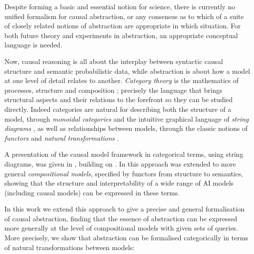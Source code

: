 \documentclass{article}
\begin{document}
Despite forming a basic and essential notion for science, there is currently no unified formalism for causal abstraction, or any consensus as to which of a suite of closely related notions of abstraction are appropriate in which situation. For both future theory and experiments in abstraction, an appropriate conceptual language is needed.  


Now, causal reasoning is all about the interplay between syntactic causal structure and semantic probabilistic data, while abstraction is about how a model at one level of detail relates to another. \emph{Category theory} is the mathematics of processes, structure and composition \cite{coecke2006introducing,leinster2014basic}; precisely the language that brings structural aspects and their relations to the forefront so they can be studied directly. Indeed categories are natural for describing both the structure of a model, through \emph{monoidal categories} and the intuitive graphical language of \emph{string diagrams} \cite{piedeleu2023introduction,lorenz2023causal,tull2024towards}, as well as relationships between models, through the classic notions of \emph{functors} and \emph{natural transformations} \cite{mac2013categories}. 


A presentation of the causal model framework in categorical terms, using string diagrams, was given in \cite{lorenz2021causal}, building on \cite{jacobs2019causal,fritz2023d}.  In \cite{tull2024towards} this approach was extended to more general \emph{compositional models}, specified by functors from structure to semantics, showing that the structure and interpretability of a wide range of AI models (including causal models) can be expressed in these terms. 


In this work we extend this approach to give a precise and general formalisation of causal abstraction, finding that the essence of abstraction can be expressed more generally at the level of compositional models with given sets of queries. More precisely, we show that abstraction can be formalised categorically in terms of natural transformations between models:
\end{document}
